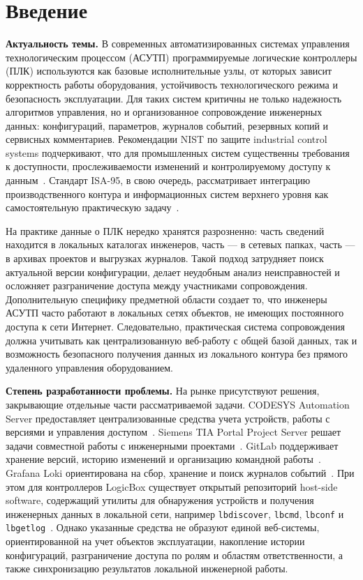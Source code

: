 \section*{Введение}

\textbf{Актуальность темы.} В современных автоматизированных системах управления
технологическим процессом (АСУТП) программируемые логические контроллеры (ПЛК)
используются как базовые исполнительные узлы, от которых зависит корректность
работы оборудования, устойчивость технологического режима и безопасность
эксплуатации. Для таких систем критичны не только надежность алгоритмов
управления, но и организованное сопровождение инженерных данных: конфигураций,
параметров, журналов событий, резервных копий и сервисных комментариев.
Рекомендации NIST по защите industrial control systems подчеркивают, что для
промышленных систем существенны требования к доступности, прослеживаемости
изменений и контролируемому доступу к данным~\cite{nist_ics}. Стандарт ISA-95,
в свою очередь, рассматривает интеграцию производственного контура и
информационных систем верхнего уровня как самостоятельную практическую
задачу~\cite{isa95}.

На практике данные о ПЛК нередко хранятся разрозненно: часть сведений находится в
локальных каталогах инженеров, часть --- в сетевых папках, часть --- в архивах
проектов и выгрузках журналов. Такой подход затрудняет поиск актуальной версии
конфигурации, делает неудобным анализ неисправностей и осложняет разграничение
доступа между участниками сопровождения. Дополнительную специфику предметной
области создает то, что инженеры АСУТП часто работают в локальных сетях объектов,
не имеющих постоянного доступа к сети Интернет. Следовательно, практическая
система сопровождения должна учитывать как централизованную веб-работу с общей
базой данных, так и возможность безопасного получения данных из локального
контура без прямого удаленного управления оборудованием.

\textbf{Степень разработанности проблемы.} На рынке присутствуют решения,
закрывающие отдельные части рассматриваемой задачи. CODESYS Automation Server
предоставляет централизованные средства учета устройств, работы с версиями и
управления доступом~\cite{codesys_as}. Siemens TIA Portal Project Server решает
задачи совместной работы с инженерными проектами~\cite{siemens_multiuser}.
GitLab поддерживает хранение версий, историю изменений и организацию командной
работы~\cite{gitlab_platform,gitlab_issues}. Grafana Loki ориентирована на сбор,
хранение и поиск журналов событий~\cite{loki_overview}. При этом для контроллеров
LogicBox существует открытый репозиторий host-side software, содержащий утилиты
для обнаружения устройств и получения инженерных данных в локальной сети,
например \texttt{lbdiscover}, \texttt{lbcmd}, \texttt{lbconf} и
\texttt{lbgetlog}~\cite{logicbox_repo}. Однако указанные средства не образуют
единой веб-системы, ориентированной на учет объектов эксплуатации, накопление
истории конфигураций, разграничение доступа по ролям и областям ответственности,
а также синхронизацию результатов локальной инженерной работы.

